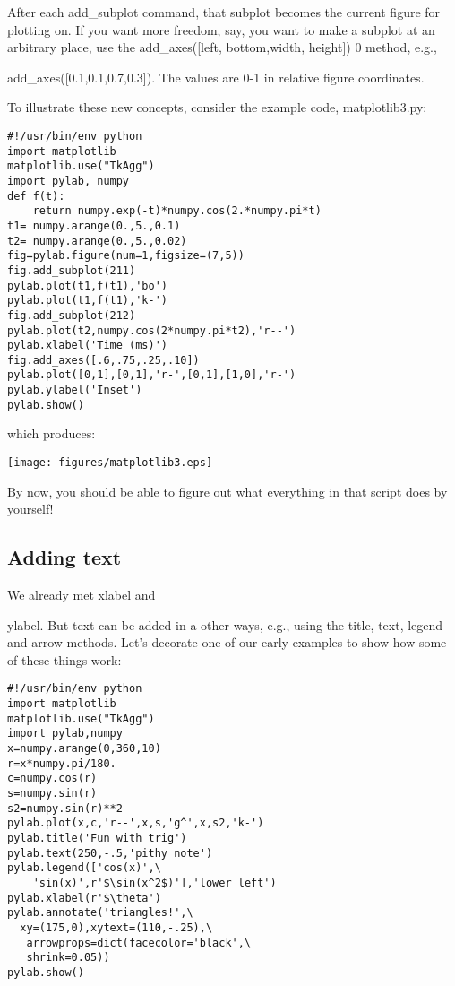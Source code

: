 {After each {\color{blue}add\_subplot} command, that subplot becomes the current figure for plotting on.
If you want more freedom, say, you want to make a subplot at an arbitrary place,  use the {\color{blue}add\_axes([left, bottom,width, height])} 0 method, e.g.,  {{\color{blue}add\_axes([0.1,0.1,0.7,0.3])}.  The values are 0-1 in relative figure coordinates. 

To illustrate these new concepts, consider the example code, {\color{blue}matplotlib3.py}:

{\singlespacing \color{blue} \begin{verbatim}
#!/usr/bin/env python
import matplotlib
matplotlib.use("TkAgg")
import pylab, numpy
def f(t):
    return numpy.exp(-t)*numpy.cos(2.*numpy.pi*t)
t1= numpy.arange(0.,5.,0.1)
t2= numpy.arange(0.,5.,0.02)
fig=pylab.figure(num=1,figsize=(7,5)) 
fig.add_subplot(211) 
pylab.plot(t1,f(t1),'bo')
pylab.plot(t1,f(t1),'k-') 
fig.add_subplot(212) 
pylab.plot(t2,numpy.cos(2*numpy.pi*t2),'r--')
pylab.xlabel('Time (ms)')
fig.add_axes([.6,.75,.25,.10])
pylab.plot([0,1],[0,1],'r-',[0,1],[1,0],'r-')
pylab.ylabel('Inset')
pylab.show()
\end{verbatim}}

\noindent which produces:

{\texttt{[image: figures/matplotlib3.eps]}}

\noindent By now, you should be able to figure out what everything in that script does by yourself!  

\subsection{Adding text}

We already met {\color{blue}xlabel} and {{\color{blue}ylabel}.  But text can be added in a other ways, e.g., using the  title, text, legend and arrow methods.
Let's decorate one of our early examples to show how some of these things work:

{\singlespacing \color{blue} \begin{verbatim}
#!/usr/bin/env python
import matplotlib
matplotlib.use("TkAgg")
import pylab,numpy
x=numpy.arange(0,360,10)
r=x*numpy.pi/180.
c=numpy.cos(r)
s=numpy.sin(r)
s2=numpy.sin(r)**2
pylab.plot(x,c,'r--',x,s,'g^',x,s2,'k-')
pylab.title('Fun with trig')
pylab.text(250,-.5,'pithy note')
pylab.legend(['cos(x)',\
    'sin(x)',r'$\sin(x^2$)'],'lower left')
pylab.xlabel(r'$\theta')
pylab.annotate('triangles!',\
  xy=(175,0),xytext=(110,-.25),\
   arrowprops=dict(facecolor='black',\
   shrink=0.05))
pylab.show()
\end{verbatim}}

}}}

